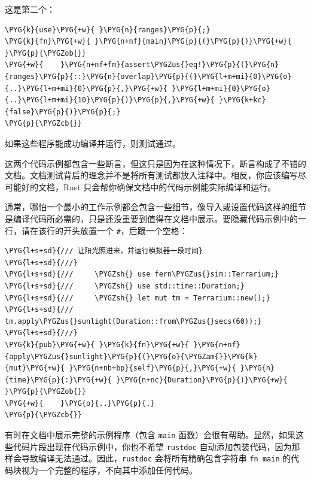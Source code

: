 这是第二个：

\begin{Verbatim}[commandchars=\\\{\},breaklines=true,breakanywhere=true,fontsize=\codefont,xleftmargin=17bp]
\PYG{k}{use}\PYG{+w}{ }\PYG{n}{ranges}\PYG{p}{;}
\PYG{k}{fn}\PYG{+w}{ }\PYG{n+nf}{main}\PYG{p}{(}\PYG{p}{)}\PYG{+w}{ }\PYG{p}{\PYGZob{}}
\PYG{+w}{    }\PYG{n+nf+fm}{assert\PYGZus{}eq!}\PYG{p}{(}\PYG{n}{ranges}\PYG{p}{::}\PYG{n}{overlap}\PYG{p}{(}\PYG{l+m+mi}{0}\PYG{o}{..}\PYG{l+m+mi}{0}\PYG{p}{,}\PYG{+w}{ }\PYG{l+m+mi}{0}\PYG{o}{..}\PYG{l+m+mi}{10}\PYG{p}{)}\PYG{p}{,}\PYG{+w}{ }\PYG{k+kc}{false}\PYG{p}{)}\PYG{p}{;}
\PYG{p}{\PYGZcb{}}
\end{Verbatim}

如果这些程序能成功编译并运行，则测试通过。

这两个代码示例都包含一些断言，但这只是因为在这种情况下，断言构成了不错的文档。文档测试背后的理念并不是将所有测试都放入注释中。相反，你应该编写尽可能好的文档，Rust 只会帮你确保文档中的代码示例能实际编译和运行。

通常，哪怕一个最小的工作示例都会包含一些细节，像导入或设置代码这样的细节是编译代码所必需的，只是还没重要到值得在文档中展示。要隐藏代码示例中的一行，请在该行的开头放置一个 \texttt{\#}，后跟一个空格：

\begin{Verbatim}[commandchars=\\\{\},breaklines=true,breakanywhere=true,fontsize=\codefont,xleftmargin=17bp]
\PYG{l+s+sd}{/// 让阳光照进来，并运行模拟器一段时间}
\PYG{l+s+sd}{///}
\PYG{l+s+sd}{///     \PYGZsh{} use fern\PYGZus{}sim::Terrarium;}
\PYG{l+s+sd}{///     \PYGZsh{} use std::time::Duration;}
\PYG{l+s+sd}{///     \PYGZsh{} let mut tm = Terrarium::new();}
\PYG{l+s+sd}{///     tm.apply\PYGZus{}sunlight(Duration::from\PYGZus{}secs(60));}
\PYG{l+s+sd}{///}
\PYG{k}{pub}\PYG{+w}{ }\PYG{k}{fn}\PYG{+w}{ }\PYG{n+nf}{apply\PYGZus{}sunlight}\PYG{p}{(}\PYG{o}{\PYGZam{}}\PYG{k}{mut}\PYG{+w}{ }\PYG{n+nb+bp}{self}\PYG{p}{,}\PYG{+w}{ }\PYG{n}{time}\PYG{p}{:}\PYG{+w}{ }\PYG{n+nc}{Duration}\PYG{p}{)}\PYG{+w}{ }\PYG{p}{\PYGZob{}}
\PYG{+w}{    }\PYG{o}{..}\PYG{p}{.}
\PYG{p}{\PYGZcb{}}
\end{Verbatim}

有时在文档中展示完整的示例程序（包含 \texttt{main} 函数）会很有帮助。显然，如果这些代码片段出现在代码示例中，你也不希望 \texttt{rustdoc} 自动添加包装代码，因为那样会导致编译无法通过。因此，\texttt{rustdoc} 会将所有精确包含字符串 \texttt{fn main} 的代码块视为一个完整的程序，不向其中添加任何代码。

